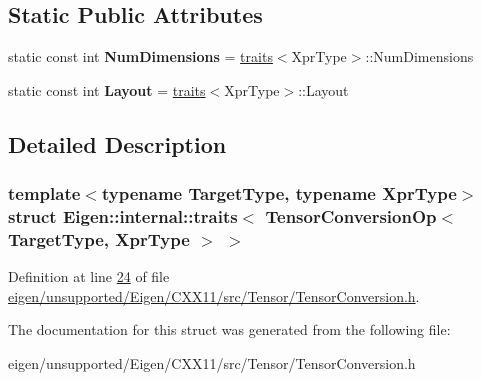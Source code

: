 \subsection*{Static Public Attributes}
\begin{DoxyCompactItemize}
\item 
\mbox{\label{struct_eigen_1_1internal_1_1traits_3_01_tensor_conversion_op_3_01_target_type_00_01_xpr_type_01_4_01_4_a2f33ebe330eba153b295d17cbd602934}} 
static const int {\bfseries Num\+Dimensions} = \hyperlink{struct_eigen_1_1internal_1_1traits}{traits}$<$Xpr\+Type$>$\+::Num\+Dimensions
\item 
\mbox{\label{struct_eigen_1_1internal_1_1traits_3_01_tensor_conversion_op_3_01_target_type_00_01_xpr_type_01_4_01_4_a6ff7a90370276f567e1e430f984aaf69}} 
static const int {\bfseries Layout} = \hyperlink{struct_eigen_1_1internal_1_1traits}{traits}$<$Xpr\+Type$>$\+::Layout
\end{DoxyCompactItemize}


\subsection{Detailed Description}
\subsubsection*{template$<$typename Target\+Type, typename Xpr\+Type$>$\newline
struct Eigen\+::internal\+::traits$<$ Tensor\+Conversion\+Op$<$ Target\+Type, Xpr\+Type $>$ $>$}



Definition at line \hyperlink{eigen_2unsupported_2_eigen_2_c_x_x11_2src_2_tensor_2_tensor_conversion_8h_source_l00024}{24} of file \hyperlink{eigen_2unsupported_2_eigen_2_c_x_x11_2src_2_tensor_2_tensor_conversion_8h_source}{eigen/unsupported/\+Eigen/\+C\+X\+X11/src/\+Tensor/\+Tensor\+Conversion.\+h}.



The documentation for this struct was generated from the following file\+:\begin{DoxyCompactItemize}
\item 
eigen/unsupported/\+Eigen/\+C\+X\+X11/src/\+Tensor/\+Tensor\+Conversion.\+h\end{DoxyCompactItemize}
